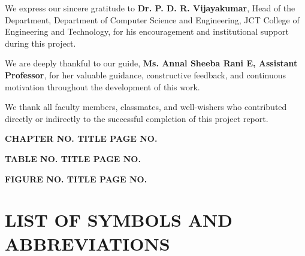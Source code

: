 \documentclass[12pt,a4paper]{report}
\begin{document}
We express our sincere gratitude to \textbf{Dr. P. D. R. Vijayakumar}, Head of the Department,
Department of Computer Science and Engineering, JCT College of Engineering and Technology,
for his encouragement and institutional support during this project.

We are deeply thankful to our guide, \textbf{Ms. Annal Sheeba Rani E, Assistant Professor},
for her valuable guidance, constructive feedback, and continuous motivation throughout the
development of this work.

We thank all faculty members, classmates, and well-wishers who contributed directly or indirectly
to the successful completion of this project report.

\newpage

\renewcommand{\contentsname}{TABLE OF CONTENTS}
\begin{center}
\textbf{CHAPTER NO. \hspace{2.2cm} TITLE \hspace{7.2cm} PAGE NO.}
\end{center}
\vspace{0.35cm}
\tableofcontents

\clearpage
\renewcommand{\listtablename}{LIST OF TABLES}
\begin{center}
\textbf{TABLE NO. \hspace{2.4cm} TITLE \hspace{7.1cm} PAGE NO.}
\end{center}
\vspace{0.35cm}
\listoftables
{}

\clearpage
\renewcommand{\listfigurename}{LIST OF FIGURES}
\begin{center}
\textbf{FIGURE NO. \hspace{2.2cm} TITLE \hspace{7.0cm} PAGE NO.}
\end{center}
\vspace{0.35cm}
\listoffigures
{}

\clearpage
\chapter*{LIST OF SYMBOLS AND ABBREVIATIONS}
\end{document}
